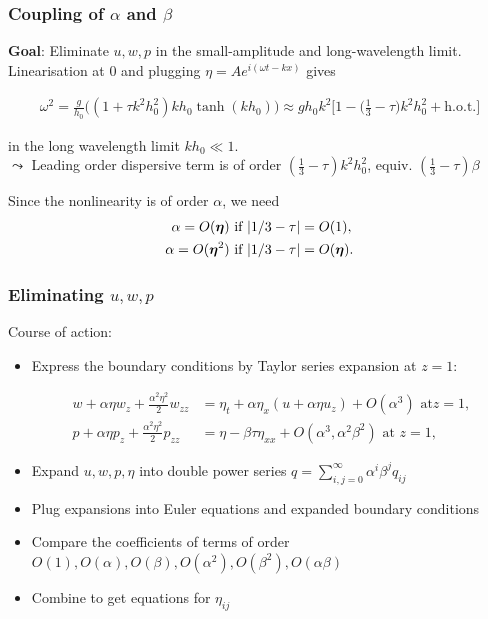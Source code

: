 \documentclass[9pt, english]{beamer}
\theoremstyle{definition}
\begin{document}
\begin{frame}
  \frametitle{Coupling of $\alpha$ and $\beta$}
  {\bf Goal}: Eliminate $u,w,p$ in the small-amplitude and long-wavelength limit.\\
 \bigskip
Linearisation at $0$ and plugging $\eta=Ae^{i(\omega t - kx)}$ gives
\begin{block}{}{\small
\begin{equation*}\begin{aligned}
\omega^2 = \frac{g}{h_0}\Big((1+\tau k^2h_0^2)kh_0\tanh(kh_0)\Big)
\approx gh_0k^2\Big[1-\Big(\frac{1}{3} - \tau\Big)k^2h_0^2 +
\mbox{h.o.t.}\Big]
\end{aligned}\end{equation*}}
\end{block}
in the long wavelength limit $kh_0 \ll 1$.\\
\bigskip
$\leadsto$ Leading order dispersive term is of order
$(\frac{1}{3}-\tau)k^2h_0^2$, equiv. $(\frac{1}{3}-\tau)\beta$
\begin{block}{}
Since the nonlinearity is of order $\alpha$, we need
\begin{equation*}\begin{aligned}
  \alpha=O({\boldsymbol{\eta}}) &\mbox{ if } {\lvert{1/3-\tau}\rvert}=O(1),\\
  \alpha=O({\boldsymbol{\eta}}^2) &\mbox{ if } {\lvert{1/3-\tau}\rvert}=O({\boldsymbol{\eta}}).
\end{aligned}\end{equation*}
\end{block}
\end{frame}

\begin{frame}
  \frametitle{Eliminating $u,w,p$}
  Course of action:
  \begin{itemize}
   \item Express the boundary conditions by Taylor series expansion at $z=1$:
\begin{block}{}
\vspace{-0.35cm}
\begin{equation*}\begin{aligned}
  w + \alpha\eta w_z + \frac{\alpha^2\eta^2}{2} w_{zz}&=\eta_t+\alpha\eta_x (u + \alpha\eta u_z) + O(\alpha^3) \mbox{ at
} z=1,\\
  p + \alpha\eta p_z + \frac{\alpha^2\eta^2}{2}p_{zz}&=\eta
- \beta\tau\eta_{xx} + O(\alpha^3,\alpha^2\beta^2)\mbox{ at } z=1,
\end{aligned}\end{equation*}
\end{block}
\item Expand $u,w,p,\eta$ into double power series $q=\sum_{i,j=0}^\infty \alpha^i\beta^jq_{ij}$
\item Plug expansions into Euler equations and expanded boundary conditions
\item Compare the coefficients of terms of order $O(1),O(\alpha),O(\beta),O(\alpha^2),O(\beta^2),O(\alpha\beta)$
\item Combine to get equations for $\eta_{ij}$
 \end{itemize}
\end{frame}
\end{document}
